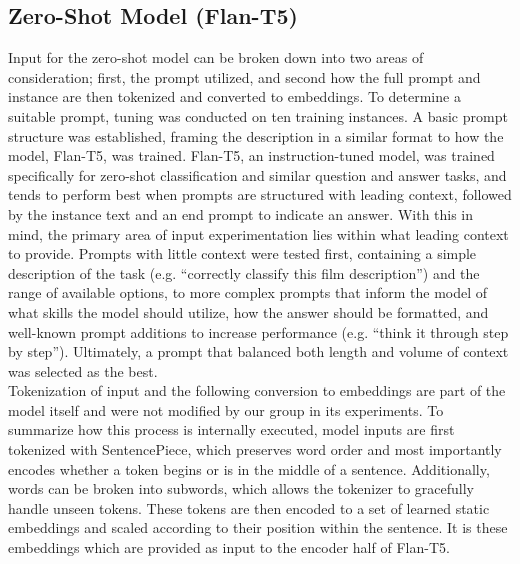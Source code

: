 \subsection{Zero-Shot Model (Flan-T5)}
Input for the zero-shot model can be broken down into two areas of consideration; first, the prompt utilized, and second how the full prompt and instance are then tokenized and converted to embeddings. 
To determine a suitable prompt, tuning was conducted on ten training instances. 
A basic prompt structure was established, framing the description in a similar format to how the model, Flan-T5, was trained.
Flan-T5, an instruction-tuned model, was trained specifically for zero-shot classification and similar question and answer tasks, and tends to perform best when prompts are structured with leading context, followed by the instance text and an end prompt to indicate an answer. 
With this in mind, the primary area of input experimentation lies within what leading context to provide. 
Prompts with little context were tested first, containing a simple description of the task (e.g. “correctly classify this film description”) and the range of available options, to more complex prompts that inform the model of what skills the model should utilize, how the answer should be formatted, and well-known prompt additions to increase performance (e.g. “think it through step by step”). 
Ultimately, a prompt that balanced both length and volume of context was selected as the best.
\\
Tokenization of input and the following conversion to embeddings are part of the model itself and were not modified by our group in its experiments. 
To summarize how this process is internally executed, model inputs are first tokenized with SentencePiece, which preserves word order and most importantly encodes whether a token begins or is in the middle of a sentence. 
Additionally, words can be broken into subwords, which allows the tokenizer to gracefully handle unseen tokens. 
These tokens are then encoded to a set of learned static embeddings and scaled according to their position within the sentence. 
It is these embeddings which are provided as input to the encoder half of Flan-T5.
